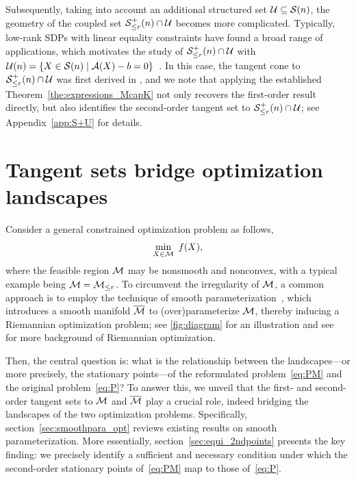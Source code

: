 Subsequently, taking into account an additional structured set $\mathcal{U}\subseteq\mathcal{S}(n)$, the geometry of the coupled set $\mathcal{S}^+_{\le r}(n)\cap\mathcal{U}$ becomes more complicated. Typically, low-rank SDPs with linear equality constraints have found a broad range of applications, which motivates the study of $\mathcal{S}^+_{\le r}(n)\cap\mathcal{U}$ with $\mathcal{U} (n)=\{X\in\mathcal{S}(n)\mid\mathcal{A}(X)-b=0\}$~\cite{boumal2020deterministic,levin2025effect}. In this case, the tangent cone to $\mathcal{S}^+_{\le r}(n)\cap\mathcal{U}$ was first derived in \cite[Corollary 4.12]{levin2025effect}, and we note that applying the established Theorem~\ref{the:expressions_McapK} not only recovers the first-order result directly, but also identifies the second-order tangent set to $\mathcal{S}^+_{\le r}(n)\cap\mathcal{U}$; see Appendix~\ref{app:S+U} for details.


\section{Tangent sets bridge optimization landscapes}\label{sec:tangent_bridge_land}
Consider a general constrained optimization problem as follows,
\begin{equation*}\label{eq:general_xanifold}
    \min_{X\in\mathcal{M}}\ f(X),
\end{equation*}
where the feasible region $\mathcal{M}$ may be nonsmooth and nonconvex, with a typical example being $\mathcal{M}=\mathcal{M}_{\le r}$. To circumvent the irregularity of $\mathcal{M}$, a common approach is to employ the technique of {smooth parameterization}~\cite{levin2023remedy,rebjock2024boundedrank,gao2024desingularizationtensor,levin2025effect,yang2025spacedecouple}, which introduces a smooth manifold $\overline{\mathcal{M}}$ to (over)parameterize $\mathcal{M}$, thereby inducing a Riemannian optimization problem; see \myfig\ref{fig:diagram} for an illustration and see~\cite{absil2008optimization,boumal2023introduction} for more background of Riemannian optimization. 



Then, the central question is: what is the relationship between the landscapes---or more precisely, the stationary points---of the reformulated problem~\eqref{eq:PM} and the original problem~\eqref{eq:P}? To answer this, we unveil that the first- and second-order tangent sets to $\mathcal{M}$ and $\overline{\mathcal{M}}$ play a crucial role, indeed bridging the landscapes of the two optimization problems. Specifically, section~\ref{sec:smoothpara_opt} reviews existing results on smooth parameterization. More essentially, section~\ref{sec:equi_2ndpoints} presents the key finding: we precisely identify a sufficient and necessary condition under which the second-order stationary points of~\eqref{eq:PM} map to those of~\eqref{eq:P}.




